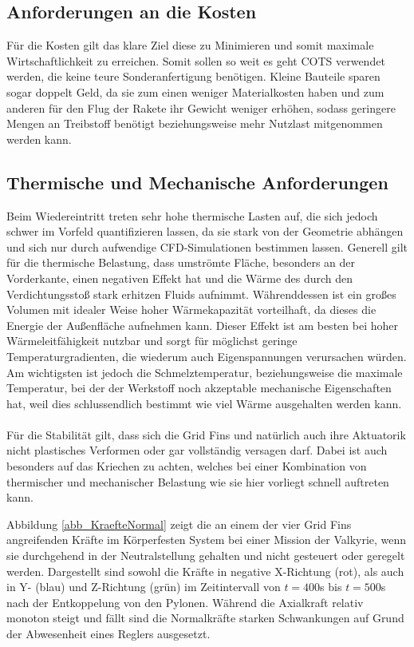 \subsection{Anforderungen an die Kosten}
Für die Kosten gilt das klare Ziel diese zu Minimieren und somit maximale Wirtschaftlichkeit zu erreichen. Somit sollen so weit es geht COTS verwendet werden, die keine teure Sonderanfertigung benötigen. Kleine Bauteile sparen sogar doppelt Geld, da sie zum einen weniger Materialkosten haben und zum anderen für den Flug der Rakete ihr Gewicht weniger erhöhen, sodass geringere Mengen an Treibstoff benötigt beziehungsweise mehr Nutzlast mitgenommen werden kann.
\subsection{Thermische und Mechanische Anforderungen}\label{sec:MechAnford}
Beim Wiedereintritt treten sehr hohe thermische Lasten auf, die sich jedoch schwer im Vorfeld quantifizieren lassen, da sie stark von der Geometrie abhängen und sich nur durch aufwendige CFD-Simulationen bestimmen lassen. Generell gilt für die thermische Belastung, dass umströmte Fläche, besonders an der Vorderkante, einen negativen Effekt hat und die Wärme des durch den Verdichtungsstoß stark erhitzen Fluids aufnimmt. Währenddessen ist ein großes Volumen mit idealer Weise hoher Wärmekapazität vorteilhaft, da dieses die Energie der Außenfläche aufnehmen kann. Dieser Effekt ist am besten bei hoher Wärmeleitfähigkeit nutzbar und sorgt für möglichst geringe Temperaturgradienten, die wiederum auch Eigenspannungen verursachen würden. Am wichtigsten ist jedoch die Schmelztemperatur, beziehungsweise die maximale Temperatur, bei der der Werkstoff noch akzeptable mechanische Eigenschaften hat, weil dies schlussendlich bestimmt wie viel Wärme ausgehalten werden kann.
\\~\\
Für die Stabilität gilt, dass sich die Grid Fins und natürlich auch ihre Aktuatorik nicht plastisches Verformen oder gar vollständig versagen darf. Dabei ist auch besonders auf das Kriechen zu achten, welches bei einer Kombination von thermischer und mechanischer Belastung wie sie hier vorliegt schnell auftreten kann.

Abbildung \ref{abb_KraefteNormal} zeigt die an einem der vier Grid Fins angreifenden Kräfte im Körperfesten System bei einer Mission der Valkyrie, wenn sie durchgehend in der Neutralstellung gehalten und nicht gesteuert oder geregelt werden. Dargestellt sind sowohl die Kräfte in negative X-Richtung (rot), als auch in Y- (blau) und Z-Richtung (grün) im Zeitintervall von $t=400$s bis $t=500$s nach der Entkoppelung von den Pylonen. Während die Axialkraft relativ monoton steigt und fällt sind die Normalkräfte starken Schwankungen auf Grund der Abwesenheit eines Reglers ausgesetzt.

